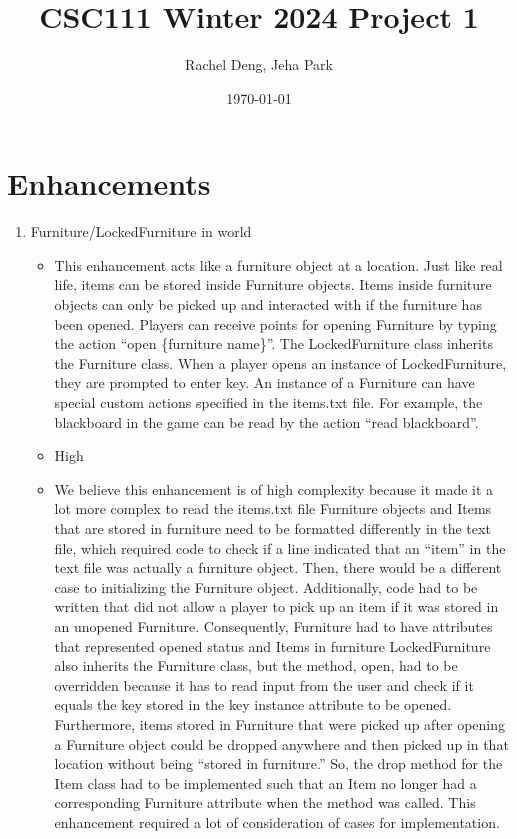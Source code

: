 \documentclass[11pt]{article}
\title{CSC111 Winter 2024 Project 1}
\author{Rachel Deng, Jeha Park}
\date{\today}
\begin{document}
\maketitle

\section*{Enhancements}


\begin{enumerate}

\item Furniture/LockedFurniture in world
	\begin{itemize}
	\item This enhancement acts like a furniture object at a location.
	Just like real life, items can be stored inside Furniture objects.
    Items inside furniture objects can only be picked up and interacted with if the furniture has been opened.
    Players can receive points for opening Furniture by typing the action ``open \{furniture name\}''.
    The LockedFurniture class inherits the Furniture class.
    When a player opens an instance of LockedFurniture, they are prompted to enter key.
    An instance of a Furniture can have special custom actions specified in the items.txt file.
    For example, the blackboard in the game can be read by the action ``read blackboard''.
	\item High
	\item We believe this enhancement is of high complexity because it made it a lot more complex to read the items.txt file
        Furniture objects and Items that are stored in furniture need to be formatted differently in the text file, which required code to check if a line
        indicated that an ``item'' in the text file was actually a furniture object.
        Then, there would be a different case to initializing the Furniture object.
        Additionally, code had to be written that did not allow a player to pick up an item if it was stored in an unopened Furniture.
        Consequently, Furniture had to have attributes that represented opened status and Items in furniture
        LockedFurniture also inherits the Furniture class, but the method, open, had to be overridden because it has to read
        input from the user and check if it equals the key stored in the key instance attribute to be opened.
        Furthermore, items stored in Furniture that were picked up after opening a Furniture object could be dropped anywhere
        and then picked up in that location without being ``stored in furniture.''
        So, the drop method for the Item class had to be implemented such that an Item no longer had a corresponding Furniture
        attribute when the method was called.
        This enhancement required a lot of consideration of cases for implementation.
	\end{itemize}


\end{enumerate}
\end{document}
